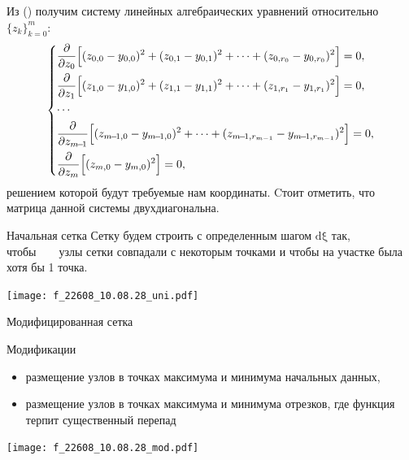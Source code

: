 \documentclass[ignoreonframetext,unicode]{beamer}
\begin{document}
\begin{frame}{}%
	\small
	Из () получим систему линейных алгебраических уравнений относительно $\{z_k\}_{k=0}^m$:
	\begin{equation*}
		\begin{dcases}
			\dfrac{\partial}{\partial{z_0}} \Big[(z_{0,0} - y_{0,0})^2 + (z_{0,1} - y_{0,1})^2  + \dots + (z_{0,r_0} - y_{0,r_0})^2 \Big] = 0,\\				
			\dfrac{\partial}{\partial{z_1}}\Big[	(z_{1,0} - y_{1,0})^2 + (z_{1,1} - y_{1,1})^2  + \dots + (z_{1,r_1} - y_{1,r_1})^2 \Big]= 0,\\
			\dotsm \\
			\dfrac{\partial}{\partial{z_{m\!-\!1}}} \Big[	(z_{m\!-\!1,0} - y_{m\!-\!1,0})^2 + \dots + (z_{m\!-\!1,r_{m-1}} - y_{m\!-\!1,r_{m-1}})^2 \Big]= 0,\\				
			\dfrac{\partial}{\partial{z_{m}}} \Big[ 	(z_{m,0} - y_{m,0})^2 \Big]= 0,\\				
		\end{dcases}			
	\end{equation*}
	решением которой будут требуемые нам координаты. Cтоит отметить, что матрица
	данной системы двухдиагональна.
	\normalsize
	
\end{frame}

\begin{frame}{Начальная сетка}
	Сетку будем строить с определенным шагом $\mathrm{d\xi}$ так, чтобы\ \ \ \  узлы сетки совпадали с некоторым точками и чтобы на участке была хотя бы 1 точка.
	
	\center
	\texttt{[image: f\_22608\_10.08.28\_uni.pdf]}
	
	
\end{frame}

\begin{frame}{Модифицированная сетка}
	\begin{block}{Модификации}
		\begin{itemize}
			\item размещение узлов в точках максимума и минимума начальных данных,
			\item размещение узлов в точках максимума и минимума отрезков, где функция терпит существенный перепад
		\end{itemize}
	\end{block}
	\center
	\texttt{[image: f\_22608\_10.08.28\_mod.pdf]}
	
\end{frame}
\end{document}
